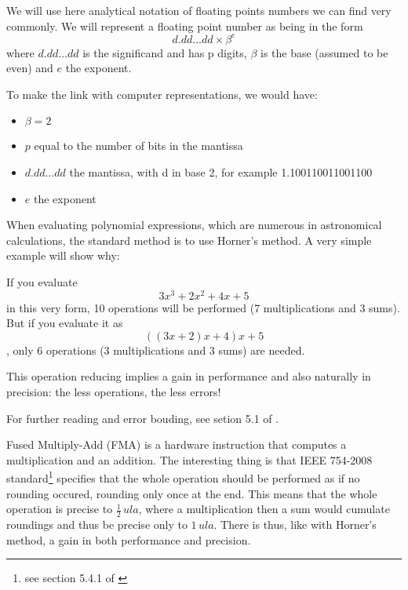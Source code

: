 
We will use here analytical notation of floating points numbers we can find very commonly. We will represent a floating point number as being in the form $$d.dd...dd\times\beta^e$$where $d.dd...dd$ is the significand and has p digits, $\beta$ is the base (assumed to be even) and $e$ the exponent.

To make the link with computer representations, we would have:
\begin{itemize}
\item $\beta=2$
\item $p$ equal to the number of bits in the mantissa
\item $d.dd...dd$ the mantissa, with d in base 2, for example 1.100110011001100
\item $e$ the exponent
\end{itemize}



When evaluating polynomial expressions, which are numerous in astronomical calculations, the standard method is to use Horner's method. A very simple example will show why:

If you evaluate $$3x^3 + 2x^2 + 4x + 5$$ in this very form, 10 operations will be performed (7 multiplications and 3 sums). But if you evaluate it as $$((3x + 2)x + 4)x + 5$$, only 6 operations (3 multiplications and 3 sums) are needed.

This operation reducing implies a gain in performance and also naturally in precision: the less operations, the less errors!

For further reading and error bouding, see setion 5.1 of \cite{Higham}.



Fused Multiply-Add (FMA) is a hardware instruction that computes a multiplication and an addition. The interesting thing is that IEEE 754-2008 standard\footnote{see section 5.4.1 of \cite{IEEE754}} specifies that the whole operation should be performed as if no rounding occured, rounding only once at the end. This means that the whole operation is precise to $\frac{1}{2}\,ula$, where a multiplication then a sum would cumulate roundings and thus be precise only to $1\,ula$. There is thus, like with Horner's method, a gain in both performance and precision.

